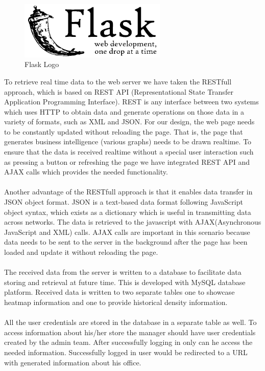 \documentclass[12pt,a4paper]{report}
\begin{document}
\begin{figure}[H]
\includegraphics[width=7cm]{flask.png}
\centering
\caption{Flask Logo}
\label{flask}
\end{figure}
To retrieve real time data to the web server we have taken the RESTfull approach, which is based on REST API (Representational State Transfer Application Programming Interface). REST is any interface between two systems which uses HTTP to obtain data and generate operations on those data in a variety of formats, such as XML and JSON. For our design, the web page needs to be constantly updated without reloading the page. That is, the page that generates business intelligence (various graphs) needs to be drawn realtime. To ensure that the data is received realtime without a special user interaction such as pressing a button or refreshing the page we have integrated REST API and AJAX calls which provides the needed functionality.\\\\
Another advantage of the RESTfull approach is that it enables data transfer in JSON object format. JSON is a text-based data format following JavaScript object syntax, which exists as a dictionary which is useful in transmitting data across networks. The data is retrieved to the javascript with AJAX(Asynchronous JavaScript and XML) calls. AJAX calls are important in this scenario because data needs to be sent to the server in the background after the page has been loaded and update it without reloading the page.\\\\
The received data from the server is written to a database to facilitate data storing and retrieval at future time. This is developed with MySQL database platform. Received data is written to two separate tables one to showcase heatmap information and one to provide historical density information. \\\\
All the user credentials are stored in the database in a separate table as well. To access information about his/her store the manager should have user credentials created by the admin team. After successfully logging in only can he access the needed information. Successfully logged in user would be redirected to a URL with generated information about his office.\\\\
\end{document}
